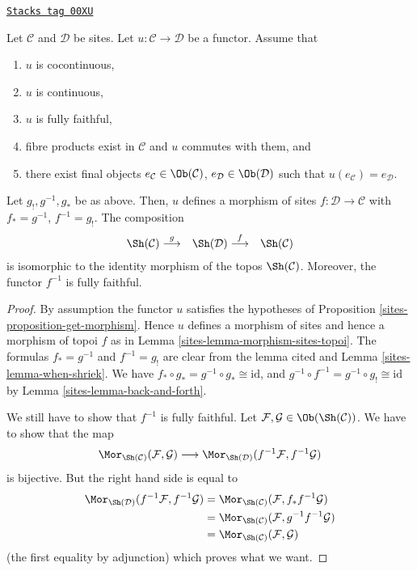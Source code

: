 \begin{lemma}
\label{sites-lemma-bigger-site}
\href{https://stacks.math.columbia.edu/tag/00XU}{\texttt{Stacks tag 00XU}}

Let $\mathcal{C}$ and $\mathcal{D}$ be sites.
Let $u : \mathcal{C} \to \mathcal{D}$ be a functor.
Assume that
\begin{enumerate}
\item[(a)] $u$ is cocontinuous,
\item[(b)] $u$ is continuous,
\item[(c)] $u$ is fully faithful,
\item[(d)] fibre products exist in $\mathcal{C}$ and $u$ commutes with them,
and
\item[(e)] there exist final objects
$e_\mathcal{C} \in \Ob(\mathcal{C})$,
$e_\mathcal{D} \in \Ob(\mathcal{D})$ such that
$u(e_\mathcal{C}) = e_\mathcal{D}$.
\end{enumerate}
Let $g_!, g^{-1}, g_*$ be as above. Then, $u$ defines a morphism of sites
$f : \mathcal{D} \to \mathcal{C}$ with $f_* = g^{-1}$, $f^{-1} = g_!$.
The composition
$$
\begin{array}{ccc}\Sh(\mathcal{C}) \overset{g}{\longrightarrow} & \Sh(\mathcal{D}) \overset{f}{\longrightarrow} & \Sh(\mathcal{C})\end{array}
$$
is isomorphic to the identity morphism of the topos
$\Sh(\mathcal{C})$. Moreover, the functor $f^{-1}$ is fully faithful.
\end{lemma}

\begin{proof}

By assumption the functor $u$ satisfies the hypotheses of
Proposition \ref{sites-proposition-get-morphism}. Hence $u$ defines
a morphism of sites and hence a morphism of topoi $f$ as in
Lemma \ref{sites-lemma-morphism-sites-topoi}. The formulas
$f_* = g^{-1}$ and $f^{-1} = g_!$ are clear from the lemma cited and
Lemma \ref{sites-lemma-when-shriek}.
We have
$f_* \circ g_* = g^{-1} \circ g_* \cong \text{id}$, and
$g^{-1} \circ f^{-1} = g^{-1} \circ g_! \cong \text{id}$
by Lemma \ref{sites-lemma-back-and-forth}.

\medskip\noindent
We still have to show that $f^{-1}$ is fully faithful.
Let $\mathcal{F}, \mathcal{G} \in \Ob(\Sh(\mathcal{C}))$.
We have to show that the map
$$
\Mor_{\Sh(\mathcal{C})}(\mathcal{F}, \mathcal{G})
\longrightarrow
\Mor_{\Sh(\mathcal{D})}(f^{-1}\mathcal{F}, f^{-1}\mathcal{G})
$$
is bijective. But the right hand side is equal to
\begin{align*}
\Mor_{\Sh(\mathcal{D})}(f^{-1}\mathcal{F}, f^{-1}\mathcal{G})
& =
\Mor_{\Sh(\mathcal{C})}(\mathcal{F}, f_*f^{-1}\mathcal{G}) \\
& =
\Mor_{\Sh(\mathcal{C})}(\mathcal{F}, g^{-1}f^{-1}\mathcal{G}) \\
& =
\Mor_{\Sh(\mathcal{C})}(\mathcal{F}, \mathcal{G})
\end{align*}
(the first equality by adjunction) which proves what we want.
\end{proof}

